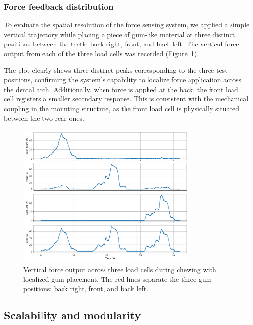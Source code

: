 \subsubsection{Force feedback distribution}

To evaluate the spatial resolution of the force sensing system, we applied a simple vertical trajectory while placing a piece of gum-like material 
at three distinct positions between the teeth: back right, front, and back left. The vertical force output from each of the three load cells was 
recorded (Figure~\ref{fig:force_distribution_gum}).

The plot clearly shows three distinct peaks corresponding to the three test positions, confirming the system's capability to localize force application 
across the dental arch. Additionally, when force is applied at the back, the front load cell registers a smaller secondary response. This is consistent 
with the mechanical coupling in the mounting structure, as the front load cell is physically situated between the two rear ones.

\begin{figure}[H]
    \centering 
    \includegraphics[width=0.8\textwidth]{figures/ForceDistributionGum.png}
    \caption{Vertical force output across three load cells during chewing with localized gum placement.  
    The red lines separate the three gum positions: back right, front, and back left.}
    \label{fig:force_distribution_gum}
\end{figure}

\subsection{Scalability and modularity}
